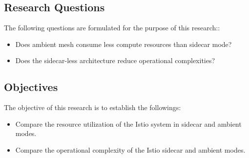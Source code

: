 \subsection{Research Questions}
The following questions are formulated for the purpose of this research::
\begin{itemize}
  \item Does ambient mesh consume less compute resources than sidecar mode?
  \item Does the sidecar-less architecture reduce operational complexities?
\end{itemize}

\subsection{Objectives}
The objective of this research is to establish the followings:
\begin{itemize}
  \item Compare the resource utilization of the Istio system in sidecar and ambient modes.
  \item Compare the operational complexity of the Istio sidecar and ambient modes.
\end{itemize}
